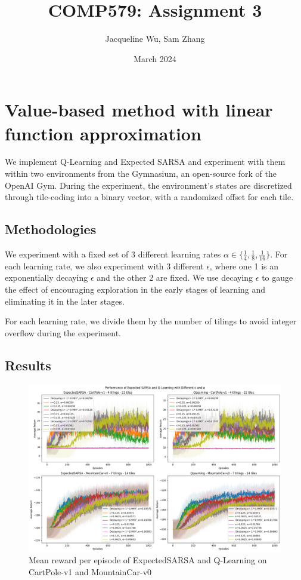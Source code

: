 \documentclass{article}
\title{COMP579: Assignment 3}
\author{Jacqueline Wu, Sam Zhang}
\date{March 2024}
\begin{document}
\maketitle




\section{Value-based method with linear function approximation}
We implement Q-Learning and Expected SARSA and experiment with them within two environments from the Gymnasium, an open-source fork of the OpenAI Gym.\cite{gymnasium}
During the experiment, the environment's states are discretized through tile-coding into a binary vector, with a randomized offset for each tile.




\subsection{Methodologies}
We experiment with a fixed set of 3 different learning rates $\alpha \in \{ \frac{1}{4}, \frac{1}{8}, \frac{1}{16} \}$.
For each learning rate, we also experiment with 3 different $\epsilon$, where one 1 is an
exponentially decaying $\epsilon$ and the other 2 are fixed. We use decaying $\epsilon$ to
gauge the effect of encouraging exploration in the early stages of learning
and eliminating it in the later stages.




For each learning rate, we divide them by the number of tilings to avoid integer overflow during
the experiment.




\subsection{Results}




\begin{figure}[htbp]
  \centering
  \includegraphics[scale=0.35]{q1.png}
  \caption{Mean reward per episode of ExpectedSARSA and Q-Learning on CartPole-v1 and MountainCar-v0}
  \label{fig:q1}
\end{figure}
\end{document}
